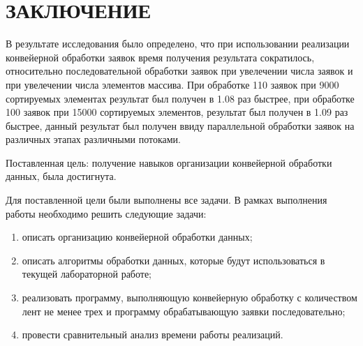 \chapter*{\hfill{\centering  ЗАКЛЮЧЕНИЕ}\hfill}

В результате исследования было определено, что при использовании реализации конвейерной обработки заявок время получения результата сократилось, относительно последовательной обработки заявок при увелечении числа заявок и при увелечении числа элементов массива. При обработке 110 заявок при 9000 сортируемых элементах результат был получен в 1.08 раз быстрее, при обработке 100 заявок при 15000 сортируемых элементов, результат был получен в 1.09 раз быстрее, данный результат был получен ввиду параллельной обработки заявок на различных этапах различными потоками.





Поставленная цель: получение навыков организации конвейерной обработки данных, была достигнута.

Для поставленной цели были выполнены все задачи.
В рамках выполнения работы необходимо решить следующие задачи: 
\begin{enumerate}
	\item описать организацию конвейерной обработки данных;
	\item описать алгоритмы обработки данных, которые будут использоваться в текущей лабораторной работе;
	\item реализовать программу, выполняющую конвейерную обработку с количеством лент не менее трех  и программу обрабатывающую заявки последовательно;
	\item провести сравнительный анализ времени работы реализаций.
\end{enumerate}

